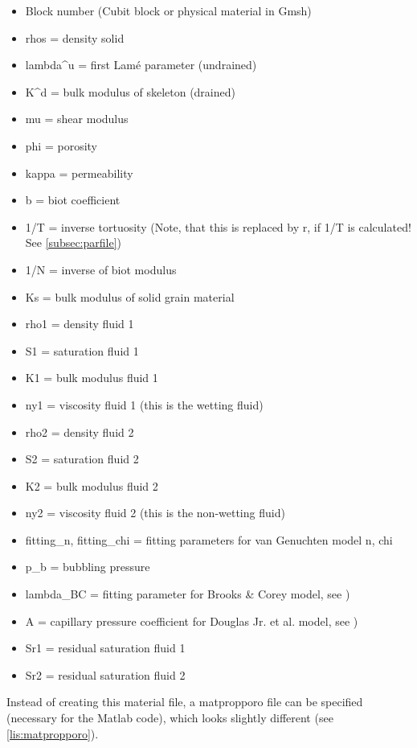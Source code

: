 		    \begin{itemize}
		    \item Block number (Cubit block or physical material in Gmsh)
		    \item rhos = density solid
		    \item lambda\^{}u = first Lamé parameter (undrained)
		    \item K\^{}d = bulk modulus of skeleton (drained)
		    \item mu = shear modulus
		    \item phi = porosity
		    \item kappa = permeability
		    \item b = biot coefficient
		    \item 1/T = inverse tortuosity (Note, that this is replaced by r, if 1/T is calculated! See \ref{subsec:parfile})
		    \item 1/N = inverse of biot modulus
		    \item Ks = bulk modulus of solid grain material
		    \item rho1 = density fluid 1
		    \item S1 = saturation fluid 1
		    \item K1 = bulk modulus fluid 1
		    \item ny1 = viscosity fluid 1 (this is the wetting fluid)
		    \item rho2 = density fluid 2
		    \item S2 = saturation fluid 2
		    \item K2 = bulk modulus fluid 2
		    \item ny2 = viscosity fluid 2 (this is the non-wetting fluid)
		    \item fitting\_n, fitting\_chi = fitting parameters for van Genuchten model n, chi \citep[see][]{Boxberg.2019}
		    \item p\_b = bubbling pressure
		    \item lambda\_BC = fitting parameter for Brooks \& Corey model, see \citep{Boxberg.2019})
		    \item A = capillary pressure coefficient for Douglas Jr. et al. model, see \citep{Boxberg.2019})
		    \item Sr1 = residual saturation fluid 1
		    \item Sr2 = residual saturation fluid 2
		    \end{itemize} 
		    		  
		  
    		  Instead of creating this material file, a matpropporo file can be specified (necessary for the Matlab code), which looks slightly different (see \ref{lis:matpropporo}).
  
